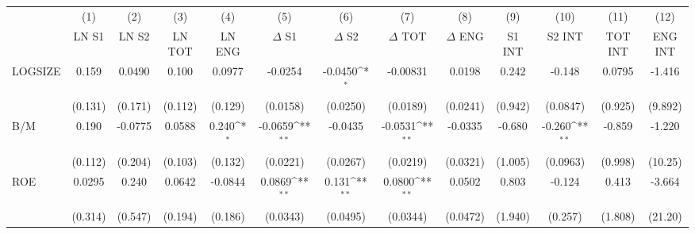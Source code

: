 {
\def\sym#1{\ifmmode^{#1}\else\(^{#1}\)\fi}
\begin{tabular}{l*{12}{c}}
\hline\hline
                    &\multicolumn{1}{c}{(1)}&\multicolumn{1}{c}{(2)}&\multicolumn{1}{c}{(3)}&\multicolumn{1}{c}{(4)}&\multicolumn{1}{c}{(5)}&\multicolumn{1}{c}{(6)}&\multicolumn{1}{c}{(7)}&\multicolumn{1}{c}{(8)}&\multicolumn{1}{c}{(9)}&\multicolumn{1}{c}{(10)}&\multicolumn{1}{c}{(11)}&\multicolumn{1}{c}{(12)}\\
                    &\multicolumn{1}{c}{LN S1}&\multicolumn{1}{c}{LN S2}&\multicolumn{1}{c}{LN TOT}&\multicolumn{1}{c}{LN ENG}&\multicolumn{1}{c}{$\Delta$ S1}&\multicolumn{1}{c}{$\Delta$ S2}&\multicolumn{1}{c}{$\Delta$ TOT}&\multicolumn{1}{c}{$\Delta$ ENG}&\multicolumn{1}{c}{S1 INT}&\multicolumn{1}{c}{S2 INT}&\multicolumn{1}{c}{TOT INT}&\multicolumn{1}{c}{ENG INT}\\
\hline
LOGSIZE             &       0.159         &      0.0490         &       0.100         &      0.0977         &     -0.0254         &     -0.0450\sym{*}  &    -0.00831         &      0.0198         &       0.242         &      -0.148         &      0.0795         &      -1.416         \\
                    &     (0.131)         &     (0.171)         &     (0.112)         &     (0.129)         &    (0.0158)         &    (0.0250)         &    (0.0189)         &    (0.0241)         &     (0.942)         &    (0.0847)         &     (0.925)         &     (9.892)         \\
B/M                 &       0.190         &     -0.0775         &      0.0588         &       0.240\sym{*}  &     -0.0659\sym{**} &     -0.0435         &     -0.0531\sym{**} &     -0.0335         &      -0.680         &      -0.260\sym{**} &      -0.859         &      -1.220         \\
                    &     (0.112)         &     (0.204)         &     (0.103)         &     (0.132)         &    (0.0221)         &    (0.0267)         &    (0.0219)         &    (0.0321)         &     (1.005)         &    (0.0963)         &     (0.998)         &     (10.25)         \\
ROE                 &      0.0295         &       0.240         &      0.0642         &     -0.0844         &      0.0869\sym{**} &       0.131\sym{**} &      0.0800\sym{**} &      0.0502         &       0.803         &      -0.124         &       0.413         &      -3.664         \\
                    &     (0.314)         &     (0.547)         &     (0.194)         &     (0.186)         &    (0.0343)         &    (0.0495)         &    (0.0344)         &    (0.0472)         &     (1.940)         &     (0.257)         &     (1.808)         &     (21.20)         \\

\end{tabular}}
